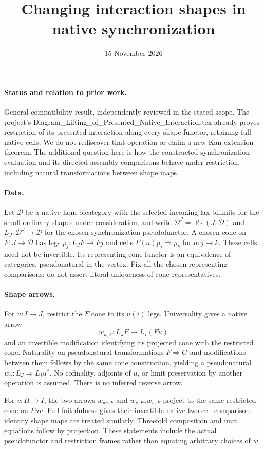 \documentclass{article}
\title{Changing interaction shapes in native synchronization}
\date{15 November 2026}
\begin{document}
\maketitle
\paragraph{Status and relation to prior work.} General compatibility result, independently reviewed in the stated scope. The project's Diagram\_Lifting\_of\_Presented\_Native\_Interaction.tex already proves restriction of its presented interaction along every shape functor, retaining full native cells. We do not rediscover that operation or claim a new Kan-extension theorem. The additional question here is how the constructed synchronization evaluation and its directed assembly comparisons behave under restriction, including natural transformations between shape maps.

\paragraph{Data.} Let $\mathcal D$ be a native hom bicategory with the selected incoming lax bilimits for the small ordinary shapes under consideration, and write $\mathcal D^J=\operatorname{Ps}(J,\mathcal D)$ and $L_J:\mathcal D^J\to\mathcal D$ for the chosen synchronization pseudofunctor. A chosen cone on $F:J\to\mathcal D$ has legs $p_j:L_JF\to Fj$ and cells $F(a)p_j\Rightarrow p_k$ for $a:j\to k$. These cells need not be invertible. Its representing cone functor is an equivalence of categories, pseudonatural in the vertex. Fix all the chosen representing comparisons; do not assert literal uniqueness of cone representatives.

\paragraph{Shape arrows.} For $u:I\to J$, restrict the $F$ cone to its $u(i)$ legs. Universality gives a native arrow
\[
 w_{u,F}:L_JF\longrightarrow L_I(Fu)
\]
and an invertible modification identifying its projected cone with the restricted cone. Naturality on pseudonatural transformations $F\Rightarrow G$ and modifications between them follows by the same cone construction, yielding a pseudonatural $w_u:L_J\Rightarrow L_Iu^*$. No cofinality, adjoints of $u$, or limit preservation by another operation is assumed. There is no inferred reverse arrow.

For $v:H\to I$, the two arrows $w_{uv,F}$ and $w_{v,Fu}w_{u,F}$ project to the same restricted cone on $Fuv$. Full faithfulness gives their invertible native two-cell comparison; identity shape maps are treated similarly. Threefold composition and unit equations follow by projection. These statements include the actual pseudofunctor and restriction frames rather than equating arbitrary choices of $w$.
\end{document}
